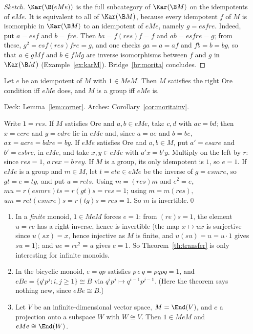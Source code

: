 \begin{proof}[Sketch]
$\Kar(\B(eMe))$ is the full subcategory of $\Kar(\B M)$ on the idempotents of $eMe$. It is equivalent to all of $\Kar(\B M)$, because every idempotent $f$ of $M$ is isomorphic in $\Kar(\B M)$ to an idempotent of $eMe$, namely $g = esfre$. Indeed, put $a = esf$ and $b = fre$. Then $ba = f(res)f = f$ and $ab = esfre = g$; from these, $g^2 = es f(res) fre = g$, and one checks $ga = a = af$ and $fb = b = bg$, so that $a\in gMf$ and $b\in fMg$ are inverse isomorphisms between $f$ and $g$ in $\Kar(\B M)$ (Example~\ref{ex:karM}). Bridge~\ref{br:morita} concludes.
\end{proof}

\begin{theorem}\label{th:transfer}
Let $e$ be an idempotent of $M$ with $1\in MeM$. Then $M$ satisfies the right Ore condition iff $eMe$ does, and $M$ is a group iff $eMe$ is.
\end{theorem}

\gen{} Deck: Lemma~\ref{lem:corner}. Arches: Corollary~\ref{cor:moritainv}.

\direct{} Write $1 = res$.
If $M$ satisfies Ore and $a,b\in eMe$, take $c,d$ with $ac = bd$; then $x = ecre$ and $y = edre$ lie in $eMe$ and, since $a = ae$ and $b = be$, $ax = acre = bdre = by$.
If $eMe$ satisfies Ore and $a,b\in M$, put $a' = esare$ and $b' = esbre$, in $eMe$, and take $x,y\in eMe$ with $a'x = b'y$. Multiply on the left by $r$: since $res = 1$, $a\,rex = b\,rey$.
If $M$ is a group, its only idempotent is $1$, so $e = 1$. If $eMe$ is a group and $m\in M$, let $t = ete\in eMe$ be the inverse of $g = esmre$, so $gt = e = tg$, and put $u = rets$. Using $m = (res)m$ and $e^2 = e$, $mu = r(esmre)ts = r(gt)s = res = 1$; using $m = m(res)$, $um = ret(esmre)s = r(tg)s = res = 1$. So $m$ is invertible.\qed

\begin{example}
\begin{enumerate}
\item In a \emph{finite} monoid, $1\in MeM$ forces $e = 1$: from $(re)s = 1$, the element $u = re$ has a right inverse, hence is invertible (the map $x\mapsto ux$ is surjective since $u(sx) = x$, hence injective as $M$ is finite, and $u(su) = u = u\cdot 1$ gives $su = 1$); and $ue = re^2 = u$ gives $e = 1$. So Theorem~\ref{th:transfer} is only interesting for infinite monoids.
\item In the bicyclic monoid, $e = qp$ satisfies $p\,e\,q = pqpq = 1$, and $eBe = \{q^ip^j : i,j\ge 1\}\cong B$ via $q^ip^j\mapsto q^{i-1}p^{j-1}$. (Here the theorem says nothing new, since $eBe\cong B$.)
\item Let $V$ be an infinite-dimensional vector space, $M = \End(V)$, and $e$ a projection onto a subspace $W$ with $W\cong V$. Then $1\in MeM$ and $eMe\cong\End(W)$.
\end{enumerate}
\end{example}

